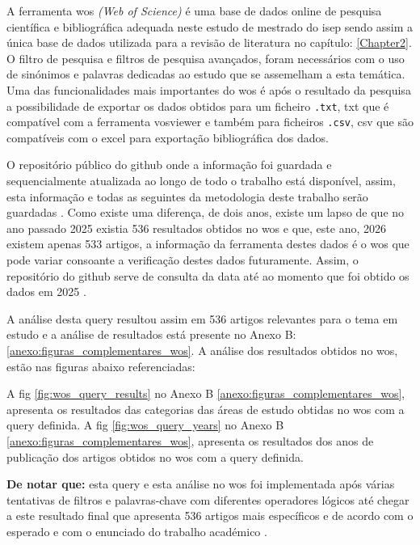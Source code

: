 A ferramenta \gls{wos} \textit{(Web of Science)} é uma base de dados online de pesquisa científica e bibliográfica adequada neste estudo de mestrado do \gls{isep}  sendo assim a única base de dados utilizada para a revisão de literatura no capítulo: \ref{Chapter2}.
O filtro de pesquisa e filtros de pesquisa avançados, foram necessários com o uso de sinónimos e palavras dedicadas ao estudo que se assemelham a esta temática.
Uma das funcionalidades mais importantes do \gls{wos} é após o resultado da pesquisa a possibilidade de exportar os dados obtidos para um ficheiro \verb|.txt|, \gls{txt} que é compatível com a ferramenta \gls{vosviewer} e também para ficheiros \verb|.csv|, \gls{csv} que são compatíveis com o \gls{excel} para exportação bibliográfica dos dados.

O repositório público do \gls{github} onde a informação foi guardada e sequencialmente atualizada ao longo de todo o trabalho está disponível, assim,  esta informação e todas as seguintes da metodologia deste trabalho serão guardadas \cite{JunqueiraDevEduardoRepositório}.
Como existe uma diferença, de dois anos, existe um lapso de que no  ano passado 2025 existia 536 resultados obtidos no \gls{wos}  e que, este ano, 2026 existem apenas 533 artigos, a informação da ferramenta destes dados é o \gls{wos} que pode variar consoante a verificação destes dados futuramente. Assim, o repositório do \gls{github} serve de consulta da data até ao momento que foi obtido os dados em 2025 \cite{JunqueiraDevEduardoRepositório}.

A análise desta \gls{query} resultou assim em 536 artigos relevantes para o tema em estudo e a análise de resultados está presente no Anexo B: \ref{anexo:figuras_complementares_wos}.
A análise dos  resultados obtidos no \gls{wos}, estão nas  figuras abaixo referenciadas:

A \gls{fig} \ref{fig:wos_query_results} no Anexo B \ref{anexo:figuras_complementares_wos}, apresenta os resultados das categorias das áreas de estudo obtidas no \gls{wos} com a \gls{query} definida.
A \gls{fig} \ref{fig:wos_query_years} no Anexo B \ref{anexo:figuras_complementares_wos}, apresenta os resultados dos anos de publicação dos artigos obtidos no \gls{wos} com a \gls{query} definida.

\textbf{De notar que:} esta \gls{query} e esta análise no \gls{wos} foi implementada após várias tentativas de filtros e palavras-chave com diferentes operadores lógicos até chegar a este resultado final que apresenta 536 artigos mais específicos e de acordo com o esperado e com o enunciado do trabalho académico \cite{MoodleEnunciado}.


